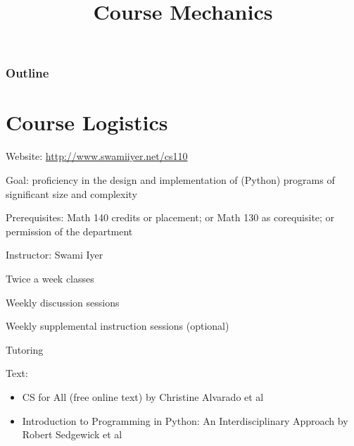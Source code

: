 \documentclass[8pt,a4paper,compress]{beamer}
\title{Course Mechanics}
\date{}
\begin{document}
\begin{frame}
\vfill
\titlepage
\end{frame}

\begin{frame}
\frametitle{Outline}
\tableofcontents
\end{frame}

\section{Course Logistics}
\begin{frame}[fragile]
Website: \href{http://www.swamiiyer.net/cs110}{http://www.swamiiyer.net/cs110}

\bigskip

Goal: proficiency in the design and implementation of (Python) programs of significant size and complexity

\bigskip

Prerequisites: Math 140 credits or placement; or Math 130 as corequisite; or permission of the department

\bigskip

Instructor: Swami Iyer

\bigskip

Twice a week classes

\bigskip
Weekly discussion sessions

\bigskip

Weekly supplemental instruction sessions (optional)

\bigskip

Tutoring

\bigskip

Text: 
\begin{itemize}
\item CS for All (free online text) by Christine Alvarado et al
\item Introduction to Programming in Python: An Interdisciplinary Approach by Robert Sedgewick et al
\end{itemize}
\end{frame}
\end{document}
